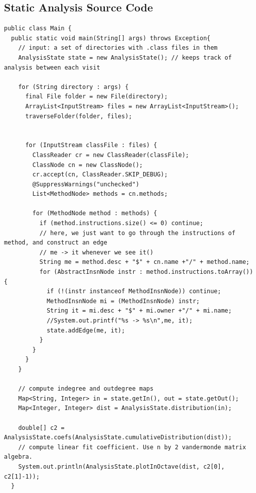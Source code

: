 \documentclass[11pt,a4paper,twocolumn]{article}
\begin{document}
\begin{singlespace}
\printbibliography[title={References}]

\onecolumn
\begin{appendices}
\section{Static Analysis Source Code}
\begin{lstlisting}[caption={Main.java}]
public class Main {
  public static void main(String[] args) throws Exception{
    // input: a set of directories with .class files in them
    AnalysisState state = new AnalysisState(); // keeps track of analysis between each visit

    for (String directory : args) {
      final File folder = new File(directory);
      ArrayList<InputStream> files = new ArrayList<InputStream>();
      traverseFolder(folder, files);


      for (InputStream classFile : files) {
        ClassReader cr = new ClassReader(classFile);
        ClassNode cn = new ClassNode();
        cr.accept(cn, ClassReader.SKIP_DEBUG);
        @SuppressWarnings("unchecked")
        List<MethodNode> methods = cn.methods;

        for (MethodNode method : methods) {
          if (method.instructions.size() <= 0) continue;
          // here, we just want to go through the instructions of method, and construct an edge
          // me -> it whenever we see it()
          String me = method.desc + "$" + cn.name +"/" + method.name;
          for (AbstractInsnNode instr : method.instructions.toArray()) {
            if (!(instr instanceof MethodInsnNode)) continue;
            MethodInsnNode mi = (MethodInsnNode) instr;
            String it = mi.desc + "$" + mi.owner +"/" + mi.name;
            //System.out.printf("%s -> %s\n",me, it);
            state.addEdge(me, it);
          }
        }
      }
    }

    // compute indegree and outdegree maps
    Map<String, Integer> in = state.getIn(), out = state.getOut();
    Map<Integer, Integer> dist = AnalysisState.distribution(in);

    double[] c2 = AnalysisState.coefs(AnalysisState.cumulativeDistribution(dist));
    // compute linear fit coefficient. Use n by 2 vandermonde matrix algebra.
    System.out.println(AnalysisState.plotInOctave(dist, c2[0], c2[1]-1));
  }


\end{lstlisting}
\end{appendices}
\end{singlespace}
\end{document}

